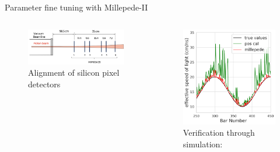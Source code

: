 \documentclass{ikpKoeln}
\begin{document}
\begin{frame}[t]{Parameter fine tuning with Millepede-II}
\begin{columns}[t]
\begin{column}{0.45 \textwidth}
			\begin{figure}
				\vspace{-0.5em}
				\includegraphics[width =\textwidth]{DPG2025/SilliconPixel.png}
				\caption*{Alignment of silicon pixel detectors }
			\end{figure}
		\end{column}
		\begin{column}{0.45 \textwidth}
			\pause
			\begin{figure}
				\captionsetup{singlelinecheck=off}
				\caption*{Verification through simulation:}
				\vspace{-0.5em}
				\includegraphics[width = \textwidth]{DPG2025/sim_comp_c.png}
			\end{figure}
		\end{column}
	\end{columns}
\end{frame}
\end{document}
